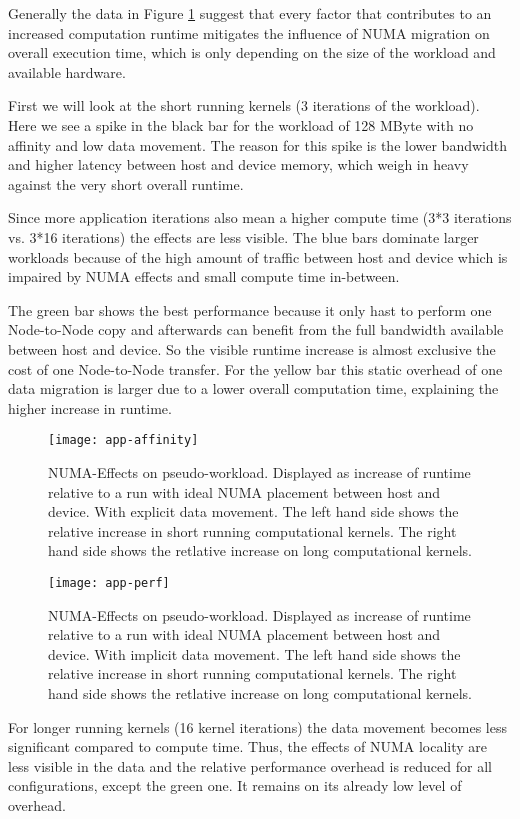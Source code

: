 Generally the data in Figure \ref{f:appaff} suggest that every factor that contributes to an increased
computation runtime  mitigates the influence of NUMA migration on overall execution time, which is only depending on the size of the workload and available hardware. 

First we will look at the short running kernels (3 iterations of the workload). Here we see a spike
in the black bar for the workload of 128 MByte with no affinity and low data movement. The reason for this spike is the lower bandwidth and higher latency between host and device memory, which weigh in heavy against the very short
overall runtime. 

Since more application iterations also mean a higher compute time (3*3 iterations vs. 3*16 iterations) the effects are less visible. The blue bars dominate larger workloads because of the high
amount of traffic between host and device which is impaired by NUMA effects and small compute time in-between.

The green bar shows the best performance because it only hast to perform one Node-to-Node copy
and afterwards can benefit from the full bandwidth available between host and device. So the visible runtime increase is almost exclusive
the cost of one Node-to-Node transfer. For the yellow bar this static overhead of one data migration is larger due to a lower overall computation time, explaining the higher increase in runtime.

\begin{figure}
	\centering
	\texttt{[image: app-affinity]}
	\caption{ NUMA-Effects on pseudo-workload. Displayed as increase of runtime relative to a run with ideal NUMA placement between host and device. With explicit data movement.
		The left hand side shows the relative increase in short running computational kernels.
		The right hand side shows the retlative increase on long computational kernels.}
	\label{f:appaff}
\end{figure}

\begin{figure}
	\centering
	\texttt{[image: app-perf]}
	\caption{ NUMA-Effects on pseudo-workload. Displayed as increase of runtime relative to a run with ideal NUMA placement between host and device. With implicit data movement.
		The left hand side shows the relative increase in short running computational kernels.
The right hand side shows the retlative increase on long computational kernels.}
	\label{f:apppref}
\end{figure}
For longer running kernels (16 kernel iterations) the data movement becomes less significant compared to compute time. Thus, the effects of NUMA locality are less visible in the data and the relative
performance overhead is reduced for all configurations, except the green one. It remains on its already
low level of overhead.

